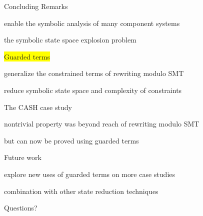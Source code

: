 \documentclass[11pt]{beamer}
\begin{document}
\begin{frame}{Concluding Remarks}
\begin{outeritemize}
    \item {}
    
    \begin{inneritemize}
        \item enable the symbolic analysis of many component systems
        \item the \alert{symbolic state space explosion problem}
    \end{inneritemize}   
    
    \item \colorbox{yellow}{Guarded terms}
      
    \begin{inneritemize}
        \item generalize the constrained terms of rewriting modulo SMT 
        \item reduce symbolic state space and complexity of constraints
    \end{inneritemize}

    \item The CASH case study
    
    \begin{inneritemize}
        \item nontrivial property was beyond  reach of rewriting modulo SMT        
        \item but can now be proved using guarded terms 
    \end{inneritemize}

    \item Future work 
    
    \begin{inneritemize}
        \item explore new uses of guarded terms on more case studies
        \item combination with other state reduction techniques
    \end{inneritemize}
  \end{outeritemize}
\end{frame}



\begin{frame}[standout]
  Questions?
\end{frame}
\end{document}
